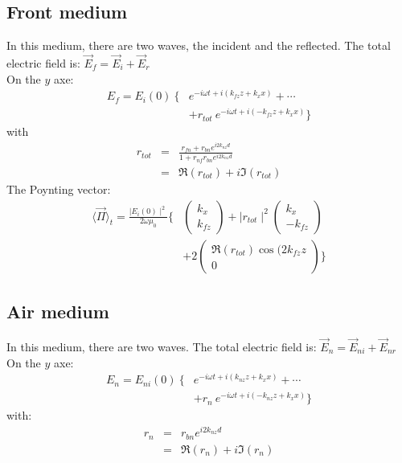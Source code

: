 \subsection{Front medium}
In this medium, there are two waves, the incident and the reflected. The total electric field is:
$\vec{E}_f = \vec{E}_i+\vec{E}_r$\\
On the $y$ axe:
\begin{eqnarray*}
E_f = E_i(0)\ 
\big\{&  e^{-i\omega t+i(k_{fz}z+k_xx)} + \cdots  \\
 &+ r_{tot} \ e^{-i\omega t+i(-k_{fz}z+k_xx)} \big\}
\end{eqnarray*}
with 
\begin{eqnarray*}
r_{tot} & = & \frac{r_{fn}+r_{bn}e^{i2k_{nz}d}}{1+r_{nf}r_{bn}e^{i2k_{nz}d}}\\
& = & \Re(r_{tot})+i\Im(r_{tot})
\end{eqnarray*}
The Poynting vector:\\
\begin{align*}
\langle \vec{\Pi} \rangle _t =\displaystyle\frac{\displaystyle\mid E_i(0)\mid ^2}{\displaystyle2\omega \mu_0}\Big\{&
\begin{pmatrix}
k_x\\
k_{fz}
\end{pmatrix}
+\mid r_{tot}\mid^2
\begin{pmatrix}
k_x\\
-k_{fz}
\end{pmatrix}\\
&+2
\begin{pmatrix}
\Re(r_{tot})\cos(2k_{fz}z\\
0
\end{pmatrix} 
\Big\}
\end{align*}

\subsection{Air medium}
In this medium, there are two waves. The total electric field is:
$\vec{E}_n=\vec{E}_{ni}+\vec{E}_{nr}$\\
On the $y$ axe:\\
\begin{eqnarray*}
E_n = E_{ni}(0)\ 
\big\{&  e^{-i\omega t+i(k_{nz}z+k_xx)} + \cdots  \\
 &+ r_n \ e^{-i\omega t+i(-k_{nz}z+k_xx)} \big\}
\end{eqnarray*}
with:
\begin{eqnarray*}
r_n & = & r_{bn}e^{i2k_{nz}d}\\
& = & \Re(r_n)+i\Im(r_n)
\end{eqnarray*}

